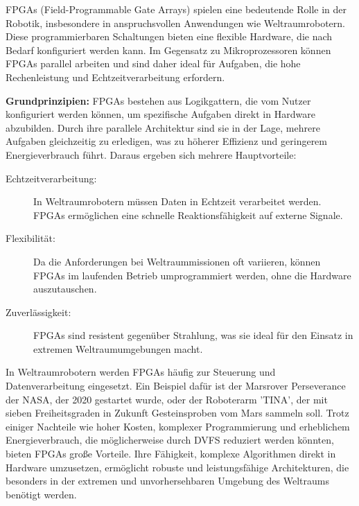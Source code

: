\documentclass[footmark=none]{tubaf-thesis}
\begin{document}
   			FPGAs (Field-Programmable Gate Arrays) spielen eine bedeutende Rolle in der Robotik, insbesondere in anspruchsvollen Anwendungen wie Weltraumrobotern. Diese programmierbaren Schaltungen bieten eine flexible Hardware, die nach Bedarf konfiguriert werden kann. Im Gegensatz zu Mikroprozessoren können FPGAs parallel arbeiten und sind daher ideal für Aufgaben, die hohe Rechenleistung und Echtzeitverarbeitung erfordern.
   			
   			\textbf{Grundprinzipien:} FPGAs bestehen aus Logikgattern, die vom Nutzer konfiguriert werden können, um spezifische Aufgaben direkt in Hardware abzubilden. Durch ihre parallele Architektur sind sie in der Lage, mehrere Aufgaben gleichzeitig zu erledigen, was zu höherer Effizienz und geringerem Energieverbrauch führt. Daraus ergeben sich mehrere Hauptvorteile:
    
			\begin{description}
				\item[Echtzeitverarbeitung:] In Weltraumrobotern müssen Daten in Echtzeit verarbeitet werden. FPGAs ermöglichen eine schnelle Reaktionsfähigkeit auf externe Signale.
				\item[Flexibilität:] Da die Anforderungen bei Weltraummissionen oft variieren, können FPGAs im laufenden Betrieb umprogrammiert werden, ohne die Hardware auszutauschen.
				\item[Zuverlässigkeit:] FPGAs sind resistent gegenüber Strahlung, was sie ideal für den Einsatz in extremen Weltraumumgebungen macht.
			\end{description}

			In Weltraumrobotern werden FPGAs häufig zur Steuerung und Datenverarbeitung eingesetzt. Ein Beispiel dafür ist der Marsrover Perseverance der NASA, der 2020 gestartet wurde, oder der Roboterarm 'TINA', der mit sieben Freiheitsgraden in Zukunft Gesteinsproben vom Mars sammeln soll. Trotz einiger Nachteile wie hoher Kosten, komplexer Programmierung und erheblichem Energieverbrauch, die möglicherweise durch DVFS reduziert werden könnten, bieten FPGAs große Vorteile. Ihre Fähigkeit, komplexe Algorithmen direkt in Hardware umzusetzen, ermöglicht robuste und leistungsfähige Architekturen, die besonders in der extremen und unvorhersehbaren Umgebung des Weltraums benötigt werden.
			

    \nocite{*} %
	\begin{sloppypar}
		\printbibliography[heading=bibintoc, title={Literaturverzeichnis}]
	\end{sloppypar}
\end{document}
